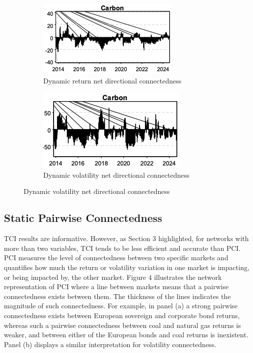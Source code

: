 \documentclass[preprint, 3p,
authoryear]{elsarticle} %
\begin{document}
\begin{figure}[H]
  \caption{Net Directional Connectedness between EUAs and other markets}
  \label{fig:NDC}
      \begin{subfigure}[b]{\textwidth}
      \centering
        \caption{Dynamic return net directional connectedness}
        \label{fig:dynretNDC}
        \includegraphics[width = 0.45\linewidth]{3a-DynRetNDC}
      \end{subfigure}
      \begin{subfigure}[b]{\textwidth}
        \centering
        \bigskip
        \caption{Dynamic volatility net directional connectedness}
        \label{fig:dynvolNDC}
        \includegraphics[width = 0.45\linewidth]{3b-DynVolNDC}
      \end{subfigure}
\end{figure}

\bigskip

\hypertarget{static-pairwise-connectedness}{%
\subsection{Static Pairwise
Connectedness}\label{static-pairwise-connectedness}}

TCI results are informative. However, as Section 3 highlighted, for
networks with more than two variables, TCI tends to be less efficient
and accurate than PCI. PCI measures the level of connectedness between
two specific markets and quantifies how much the return or volatility
variation in one market is impacting, or being impacted by, the other
market. Figure 4 illustrates the network representation of PCI where a
line between markets means that a pairwise connectedness exists between
them. The thickness of the lines indicates the magnitude of such
connectedness. For example, in panel (a) a strong pairwise connectedness
exists between European sovereign and corporate bond returns, whereas
such a pairwise connectedness between coal and natural gas returns is
weaker, and between either of the European bonds and coal returns is
inexistent. Panel (b) displays a similar interpretation for volatility
connectedness.
\end{document}
